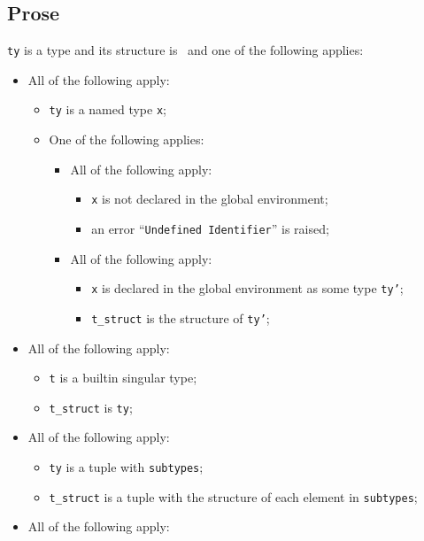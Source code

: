 \documentclass{book}
\begin{document}
    \subsection{Prose}
    \texttt{ty} is a type and its structure is \tstruct\ and one of the following
    applies:
    \begin{itemize}
    \item All of the following apply:
      \begin{itemize}
      \item \texttt{ty} is a named type \texttt{x};
      \item One of the following applies:
        \begin{itemize}
        \item All of the following apply:
          \begin{itemize}
          \item \texttt{x} is not declared in the global environment; 
          \item an error ``\texttt{Undefined Identifier}'' is raised;
          \end{itemize}
        \item All of the following apply:
          \begin{itemize}
          \item \texttt{x} is declared in the global environment as some type \texttt{ty'};
          \item \texttt{t\_struct} is the structure of \texttt{ty'};
          \end{itemize}
       \end{itemize}
      \end{itemize}
    \item All of the following apply:
      \begin{itemize}
      \item \texttt{t} is a builtin singular type;
      \item \texttt{t\_struct} is \texttt{ty};
      \end{itemize}
    \item All of the following apply:
      \begin{itemize}
      \item \texttt{ty} is a tuple with \texttt{subtypes};
      \item \texttt{t\_struct} is a tuple with the structure of each element in \texttt{subtypes};
      \end{itemize}
    \item All of the following apply:

\end{itemize}
\end{document}
